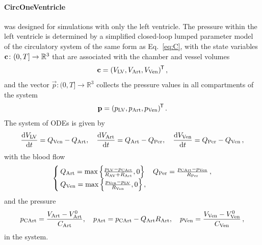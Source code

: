 \paragraph{CircOneVentricle} was designed for simulations with only the left ventricle.
The pressure within the left ventricle is determined by a simplified closed-loop lumped parameter model of the circulatory system of the same form as Eq.~\eqref{eq:C}, with the state variables $\c\colon(0,T]\rightarrow\mathbb{R}^{3}$ that are associated with the chamber and vessel volumes
\begin{equation}
    \c = (\vol{LV}, \vol{Art}, \vol{Ven})^\tran \,, \label{eq:lv:circ1}
\end{equation}
and the vector $\vec p\colon(0,T]\rightarrow\mathbb{R}^{3}$ collects the pressure values in all compartments of the system
\begin{equation}
    \vec p = (\p{LV}, \p{Art}, \p{Ven})^\tran \,.
\end{equation}
The system of ODEs is given by
\begin{equation}
    \dv{\vol{LV}}{t} = \Q{Ven} - \Q{Art} \qc
    \dv{\vol{Art}}{t} = \Q{Art} - \Q{Per} \qc
    \dv{\vol{Ven}}{t} = \Q{Per} - \Q{Ven} \,,
\end{equation}
with the blood flow 
\begin{equation}
\begin{cases}
    Q_\mathrm{Art} = \max \qty{ \frac{p_\mathrm{LV}-p_\mathrm{CArt}}{R_\text{AV} + R_\text{Art}},0} & 
    Q_\mathrm{Per} = \frac{p_\mathrm{CArt} - p_\mathrm{Ven}}{R_\text{Per}} \,,\\
    Q_\mathrm{Ven} = \max \qty{\frac{p_\mathrm{Ven} - p_\mathrm{LV}}{R_\text{Ven}},0} \,, & \\
\end{cases}
\end{equation}
and the pressure
\begin{equation}
    \p{CArt} = \frac{\vol{Art}-\vol{Art}^0}{C_\mathrm{Art}} \qc
    \p{Art} = \p{CArt} - \Q{Art}R_\text{Art} \qc
    \p{Ven} = \frac{\vol{Ven}-\vol{Ven}^0}{C_\mathrm{Ven}} \,,  \label{eq:lv:circ2}
\end{equation}
in the system.

